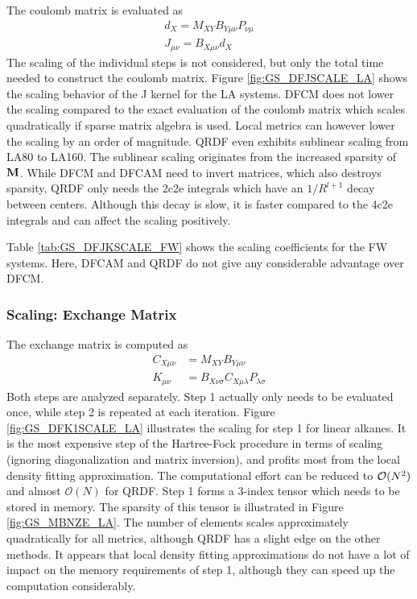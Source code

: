 The coulomb matrix is evaluated as
\begin{align}
d_X = M_{XY} B_{Y\mu\nu} P_{\nu\mu} \\
J_{\mu\nu} = B_{X\mu\nu} d_X
\end{align}
\noindent The scaling of the individual steps is not considered, but only the total time needed to construct the coulomb matrix. Figure \ref{fig:GS_DFJSCALE_LA} shows the scaling behavior of the J kernel for the LA systems. DFCM does not lower the scaling compared to the exact evaluation of the coulomb matrix which scales quadratically if sparse matrix algebra is used. Local metrics can however lower the scaling by an order of magnitude. QRDF even exhibits sublinear scaling from LA80 to LA160. The sublinear scaling originates from the increased sparsity of $\mathbf{M}$. While DFCM and DFCAM need to invert matrices, which also destroys sparsity, QRDF only needs the 2c2e integrals which have an $1/R^{l+1}$ decay between centers. Although this decay is slow, it is faster compared to the 4c2e integrals and can affect the scaling positively.

Table \ref{tab:GS_DFJKSCALE_FW} shows the scaling coefficients for the FW systems. Here, DFCAM and QRDF do not give any considerable advantage over DFCM. %

\subsubsection{Scaling: Exchange Matrix}

The exchange matrix is computed as
\begin{align}
C_{X\mu\nu} &= M_{XY} B_{Y\mu\nu} \\
K_{\mu\nu} &= B_{X\nu\sigma} C_{X\mu\lambda} P_{\lambda\sigma} 
\end{align}
\noindent Both steps are analyzed separately. Step 1 actually only needs to be evaluated once, while step 2 is repeated at each iteration. Figure \ref{fig:GS_DFK1SCALE_LA} illustrates the scaling for step 1 for linear alkanes. It is the most expensive step of the Hartree-Fock procedure in terms of scaling (ignoring diagonalization and matrix inversion), and profits most from the local density fitting approximation. The computational effort can be reduced to $\mathcal{O}(N^{2})$ and almost $\mathcal{O}(N)$ for QRDF. Step 1 forms a 3-index tensor which needs to be stored in memory. The sparsity of this tensor is illustrated in Figure \ref{fig:GS_MBNZE_LA}. The number of elements scales approximately quadratically for all metrics, although QRDF has a slight edge on the other methods. It appears that local density fitting approximations do not have a lot of impact on the memory requirements of step 1, although they can speed up the computation considerably. 

